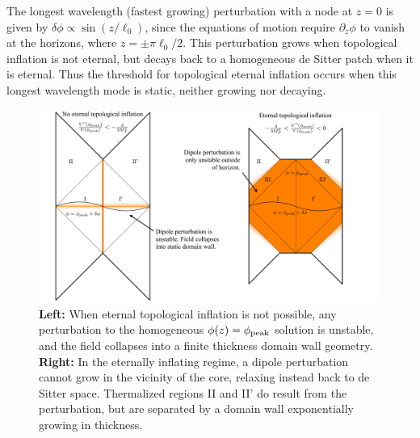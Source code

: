 \documentclass[aps,amsfonts,amsmath,prd,preprint,nofootinbib,superscriptaddress]{revtex4}
\begin{document}
\begin{appendix}
The longest wavelength (fastest growing) perturbation with a
node at $z=0$ is given by $\delta\phi \propto \sin(z/\ell_0)$, since the equations of motion require $\partial_z\phi$ to vanish at the horizons, where $z = \pm \pi \ell_0/2$.
This perturbation grows when topological inflation is not eternal, but decays back to a homogeneous de Sitter patch when it is eternal.
Thus the threshold for topological eternal inflation occurs when this longest wavelength mode is static, neither growing nor decaying.


\begin{figure}[htbp]
\begin{center}
\includegraphics[width=1\textwidth]{figures/TEI}
\caption{{\bf Left:} When eternal topological inflation is not possible, any perturbation to the homogeneous $\phi(z) = \phi_{\rm peak}$ solution is unstable, and the field collapses into a finite thickness domain wall geometry.
{\bf Right:}  In the eternally inflating regime, a dipole perturbation cannot grow in the vicinity of the core, relaxing instead back to de Sitter space.  Thermalized regions II and II' do result from the perturbation, but are separated by a domain wall exponentially growing in thickness.}
\label{fig:TEI}
\end{center}
\end{figure}





\end{appendix}
\end{document}
